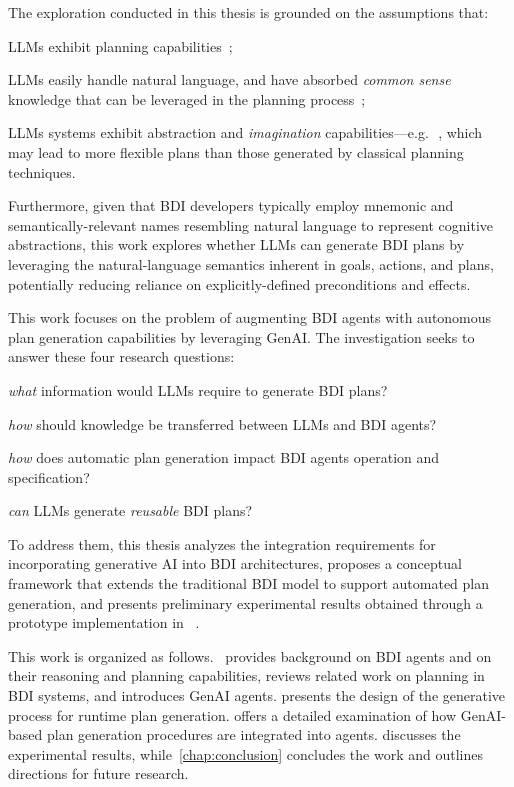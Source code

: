 \documentclass[12pt,a4paper,openright,twoside]{book}
\begin{document}
The exploration conducted in this thesis is grounded on the assumptions that:
%
\begin{inlinelist}
    \item \acp{LLM} exhibit planning capabilities~\cite{HuangLWCWL24};
    \item \acp{LLM} easily handle natural language, and have absorbed \emph{common sense} knowledge that can be leveraged in the planning process~\cite{llmoracles-kbs310};
    \item \acp{LLM} systems exhibit abstraction and \emph{imagination} capabilities---e.g.\,~\cite{AregbedeAPLL24}, which may lead to more flexible plans than those generated by classical planning techniques.
\end{inlinelist}
%
Furthermore, given that \ac{BDI} developers typically employ mnemonic and semantically-relevant names resembling natural language to represent cognitive abstractions, this work explores whether \acp{LLM} can generate \ac{BDI} plans by leveraging the natural-language semantics inherent in goals, actions, and plans, potentially reducing reliance on explicitly-defined preconditions and effects.

This work focuses on the problem of augmenting \ac{BDI} agents with autonomous plan generation capabilities by leveraging \ac{GenAI}. The investigation seeks to answer these four research questions:
%
\begin{enumerate*}[label=\textbf{(RQ\arabic*)}]
    \item\label{rq:required-info} \emph{what} information would \acp{LLM} require to generate \ac{BDI} plans?
    \item\label{rq:knowledge-transfer} \emph{how} should knowledge be transferred between \acp{LLM} and \ac{BDI} agents?
    \item\label{rq:agent-spec} \emph{how} does automatic plan generation impact \ac{BDI} agents operation and specification?
    \item\label{rq:reusability} \emph{can} \acp{LLM} generate \emph{reusable} \ac{BDI} plans?
\end{enumerate*}
%
To address them, this thesis analyzes the integration requirements for incorporating generative AI into \ac{BDI} architectures, proposes a conceptual framework that extends the traditional \ac{BDI} model to support automated plan generation, and presents preliminary experimental results obtained through a prototype implementation in \jakta{}~\cite{JaktaSNCS2024}.

This work is organized as follows.~ provides background on \ac{BDI} agents and on their reasoning and planning capabilities, reviews related work on planning in \ac{BDI} systems, and introduces \ac{GenAI} agents. 
%
 presents the design of the generative process for runtime plan generation. 
%
 offers a detailed examination of how \ac{GenAI}-based plan generation procedures are integrated into \agentspeak{} agents.
%
 discusses the experimental results, while~\cref{chap:conclusion} concludes the work and outlines directions for future research.
\end{document}
